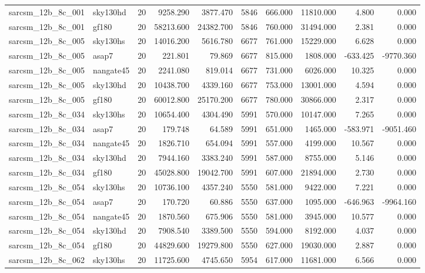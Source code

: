 \begin{longtable}{llrrrrrrrr}
sarcsm\_12b\_8c\_001 & sky130hd & 20 & 9258.290 & 3877.470 & 5846 & 666.000 & 11810.000 & 4.800 & 0.000 \\
sarcsm\_12b\_8c\_001 & gf180 & 20 & 58213.600 & 24382.700 & 5846 & 760.000 & 31494.000 & 2.381 & 0.000 \\
sarcsm\_12b\_8c\_005 & sky130hs & 20 & 14016.200 & 5616.780 & 6677 & 761.000 & 15229.000 & 6.628 & 0.000 \\
sarcsm\_12b\_8c\_005 & asap7 & 20 & 221.801 & 79.869 & 6677 & 815.000 & 1808.000 & -633.425 & -9770.360 \\
sarcsm\_12b\_8c\_005 & nangate45 & 20 & 2241.080 & 819.014 & 6677 & 731.000 & 6026.000 & 10.325 & 0.000 \\
sarcsm\_12b\_8c\_005 & sky130hd & 20 & 10438.700 & 4339.160 & 6677 & 753.000 & 13001.000 & 4.594 & 0.000 \\
sarcsm\_12b\_8c\_005 & gf180 & 20 & 60012.800 & 25170.200 & 6677 & 780.000 & 30866.000 & 2.317 & 0.000 \\
sarcsm\_12b\_8c\_034 & sky130hs & 20 & 10654.400 & 4304.490 & 5991 & 570.000 & 10147.000 & 7.265 & 0.000 \\
sarcsm\_12b\_8c\_034 & asap7 & 20 & 179.748 & 64.589 & 5991 & 651.000 & 1465.000 & -583.971 & -9051.460 \\
sarcsm\_12b\_8c\_034 & nangate45 & 20 & 1826.710 & 654.094 & 5991 & 557.000 & 4199.000 & 10.567 & 0.000 \\
sarcsm\_12b\_8c\_034 & sky130hd & 20 & 7944.160 & 3383.240 & 5991 & 587.000 & 8755.000 & 5.146 & 0.000 \\
sarcsm\_12b\_8c\_034 & gf180 & 20 & 45028.800 & 19042.700 & 5991 & 607.000 & 21894.000 & 2.730 & 0.000 \\
sarcsm\_12b\_8c\_054 & sky130hs & 20 & 10736.100 & 4357.240 & 5550 & 581.000 & 9422.000 & 7.221 & 0.000 \\
sarcsm\_12b\_8c\_054 & asap7 & 20 & 170.720 & 60.886 & 5550 & 637.000 & 1095.000 & -646.963 & -9964.160 \\
sarcsm\_12b\_8c\_054 & nangate45 & 20 & 1870.560 & 675.906 & 5550 & 581.000 & 3945.000 & 10.577 & 0.000 \\
sarcsm\_12b\_8c\_054 & sky130hd & 20 & 7908.540 & 3389.500 & 5550 & 594.000 & 8192.000 & 4.037 & 0.000 \\
sarcsm\_12b\_8c\_054 & gf180 & 20 & 44829.600 & 19279.800 & 5550 & 627.000 & 19030.000 & 2.887 & 0.000 \\
sarcsm\_12b\_8c\_062 & sky130hs & 20 & 11725.600 & 4745.650 & 5954 & 617.000 & 11681.000 & 6.566 & 0.000 \\

\end{longtable}
